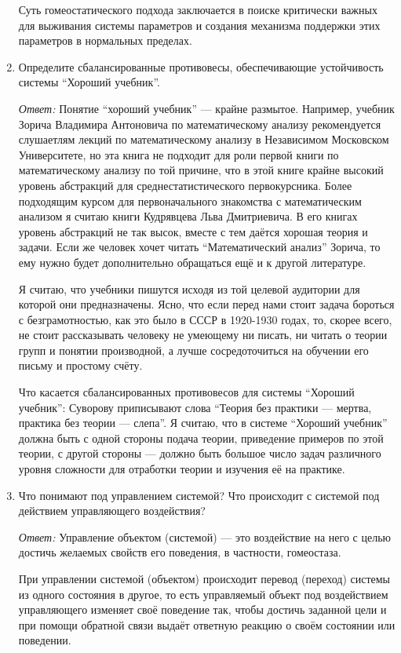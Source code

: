 \documentclass[10pt]{article}
\begin{document}
\begin{enumerate}
    Суть гомеостатического подхода заключается в поиске критически важных для выживания системы параметров и создания механизма поддержки этих параметров в нормальных пределах.

  \item{Определите сбалансированные противовесы, обеспечивающие устойчивость системы ``Хороший учебник''.}

    \emph{Ответ:} Понятие ``хороший учебник'' --- крайне размытое. Например, учебник Зорича Владимира Антоновича по математическому анализу рекомендуется слушаетлям лекций по математическому анализу в Независимом Московском Университете, но эта книга не подходит для роли первой книги по математическому анализу по той причине, что в этой книге крайне высокий уровень абстракций для среднестатистического первокурсника. Более подходящим курсом для первоначального знакомства с математическим анализом я считаю книги Кудрявцева Льва Дмитриевича. В его книгах уровень абстракций не так высок, вместе с тем даётся хорошая теория и задачи. Если же человек хочет читать ``Математический анализ'' Зорича, то ему нужно будет дополнительно обращаться ещё и к другой литературе.

    Я считаю, что учебники пишутся исходя из той целевой аудитории для которой они предназначены. Ясно, что если перед нами стоит задача бороться с безграмотностью, как это было в СССР в 1920-1930 годах, то, скорее всего, не стоит рассказывать человеку не умеющему ни писать, ни читать о теории групп и понятии производной, а лучше сосредоточиться на обучении его письму и простому счёту.

    Что касается сбалансированных противовесов для системы ``Хороший учебник'': Суворову приписывают слова ``Теория без практики --- мертва, практика без теории --- слепа''. Я считаю, что в системе ``Хороший учебник'' должна быть с одной стороны подача теории, приведение примеров по этой теории, с другой стороны --- должно быть большое число задач различного уровня сложности для отработки теории и изучения её на практике.

  \item{Что понимают под управлением системой? Что происходит с системой под действием управляющего воздействия?}

    \emph{Ответ:} Управление объектом (системой) --- это воздействие на него с целью достичь желаемых свойств его поведения, в частности, гомеостаза.

    При управлении системой (объектом) происходит перевод (переход) системы из одного состояния в другое, то есть управляемый объект под воздействием управляющего изменяет своё поведение так, чтобы достичь заданной цели и при помощи обратной связи выдаёт ответную реакцию о своём состоянии или поведении.


\end{enumerate}
\end{document}
